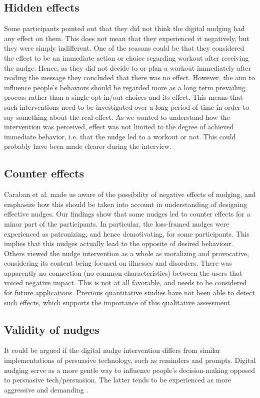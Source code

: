 \subsection{Hidden effects}
Some participants pointed out that they did not think the digital nudging had any effect on them. This does not mean that they experienced it negatively, but they were simply indifferent. One of the reasons could be that they considered the effect to be an immediate action or choice regarding workout after receiving the nudge. Hence, as they did not decide to or plan a workout immediately after reading the message they concluded that there was no effect. However, the aim to influence people's behaviors should be regarded more as a long term prevailing process rather than a single opt-in/out choices and its effect. This means that such interventions need to be investigated over a long period of time in order to say something about the real effect. As we wanted to understand how the intervention was perceived, effect was not limited to the degree of achieved immediate behavior, i.e. that the nudge led to a workout or not. This could probably have been made clearer during the interview.

\subsection{Counter effects}
Caraban et al. \cite{caraban_23_2019} made us aware of the possibility of negative effects of nudging, and emphasize how this should be taken into account in understanding of designing effective nudges. Our findings show that some nudges led to counter effects for a minor part of the participants. In particular, the loss-framed nudges were experienced as patronizing, and hence demotivating, for some participants. This implies that this nudges actually lead to the opposite of desired behaviour. Others viewed the nudge intervention as a whole as moralizing and provocative, considering its content being focused on illnesses and disorders. There was apparently no connection (no common characteristics) between the users that voiced negative impact. This is not at all favorable, and needs to be considered for future applications. Previous quantitative studies have not been able to detect such effects, which supports the importance of this qualitative assessment.   

\subsection{Validity of nudges}
It could be argued if the digital nudge intervention differs from similar implementations of persuasive technology, such as reminders and prompts. Digital nudging serve as a more gentle way to influence people's decision-making opposed to persuasive tech/persuasion. The latter tends to be experienced as more aggressive and demanding \cite{meske_status_2019}.

